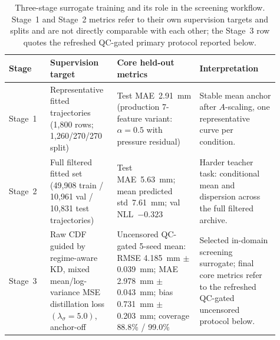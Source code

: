 \begin{table}[!ht]
\centering
\footnotesize
\setlength{\tabcolsep}{3pt}
\begin{tabular}{@{}L{0.14\linewidth}L{0.22\linewidth}L{0.28\linewidth}L{0.27\linewidth}@{}}
\toprule
Stage & Supervision target & Core held-out metrics & Interpretation \\
\midrule
Stage~1 & Representative fitted trajectories (1,800 rows; 1,260/270/270 split) &
Test MAE~\SI{2.91}{mm} (production 7-feature variant: \(\alpha=0.5\) with pressure residual) &
Stable mean anchor after \(A\)-scaling, one representative curve per condition. \\
Stage~2 & Full filtered fitted set (49{,}908 train / 10{,}961 val / 10{,}831 test trajectories) &
Test MAE~\SI{5.63}{mm}; mean predicted std~\SI{7.61}{mm}; val NLL~\(-0.323\) &
Harder teacher task: conditional mean and dispersion across the full filtered archive. \\
Stage~3 & Raw CDF guided by regime-aware KD, mixed mean/log-variance MSE distillation loss \((\lambda_\sigma=5.0)\), anchor-off &
Uncensored QC-gated 5-seed mean: RMSE \SI{4.185}{mm} \(\pm\) \SI{0.039}{mm}; MAE \SI{2.978}{mm} \(\pm\) \SI{0.043}{mm}; bias \SI{+0.731}{mm} \(\pm\) \SI{0.203}{mm}; coverage 88.8\% / 99.0\% &
Selected in-domain screening surrogate; final core metrics refer to the refreshed QC-gated uncensored protocol below. \\
\bottomrule
\end{tabular}
\caption{Three-stage surrogate training and its role in the screening workflow. Stage~1 and Stage~2 metrics refer to their own supervision targets and splits and are not directly comparable with each other; the Stage~3 row quotes the refreshed QC-gated primary protocol reported below.}
\label{tab:model-summary}
\end{table}


